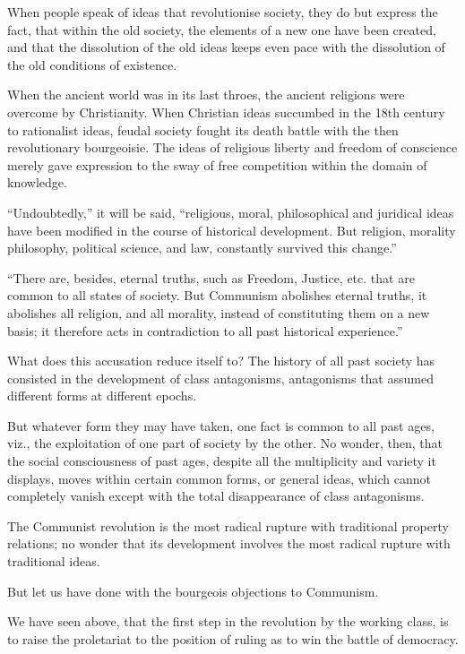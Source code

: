 When people speak of ideas that revolutionise society, they do but
express the fact, that within the old society, the elements of a new
one have been created, and that the dissolution of the old ideas keeps
even pace with the dissolution of the old conditions of existence.

When the ancient world was in its last throes, the ancient religions
were overcome by Christianity. When Christian ideas succumbed in the
18th century to rationalist ideas, feudal society fought its death
battle with the then revolutionary bourgeoisie. The ideas of religious
liberty and freedom of conscience merely gave expression to the sway of
free competition within the domain of knowledge.

\enquote{Undoubtedly,} it will be said, \enquote{religious, moral, philosophical and
juridical ideas have been modified in the course of historical
development. But religion, morality philosophy, political science, and
law, constantly survived this change.}

\enquote{There are, besides, eternal truths, such as Freedom, Justice, etc.
that are common to all states of society. But Communism abolishes
eternal truths, it abolishes all religion, and all morality, instead of
constituting them on a new basis; it therefore acts in contradiction to
all past historical experience.}

What does this accusation reduce itself to? The history of all past
society has consisted in the development of class antagonisms,
antagonisms that assumed different forms at different epochs.

But whatever form they may have taken, one fact is common to all past
ages, viz., the exploitation of one part of society by the other. No
wonder, then, that the social consciousness of past ages, despite all
the multiplicity and variety it displays, moves within certain common
forms, or general ideas, which cannot completely vanish except with the
total disappearance of class antagonisms.

The Communist revolution is the most radical rupture with traditional
property relations; no wonder that its development involves the most
radical rupture with traditional ideas.

But let us have done with the bourgeois objections to Communism.

We have seen above, that the first step in the revolution by the
working class, is to raise the proletariat to the position of ruling as
to win the battle of democracy.

